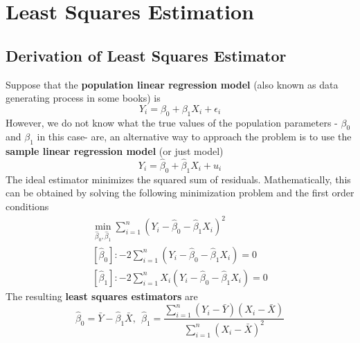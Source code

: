\chapter{Least Squares Estimation}
\section{Derivation of Least Squares Estimator}
Suppose that the \textbf{population linear regression model} (also known as data generating process in some books) is
\[
Y_i = \beta_0 + \beta_1X_i + \epsilon_i
\]
However, we do not know what the true values of the population parameters - $\beta_0$ and $\beta_1$ in this case- are, an alternative way to approach the problem is to use the \textbf{sample linear regression model} (or just model)
\[
Y_i = \hat{\beta}_0 +\hat{\beta}_1X_i +u_i
\]
The ideal estimator minimizes the squared sum of residuals. Mathematically, this can be obtained by solving the following minimization problem and the first order conditions
\footnotesize{\begin{gather*}
\min_{\hat{\beta}_0, \hat{\beta}_1} \sum_{i=1}^n (Y_i-\hat{\beta}_0 - \hat{\beta}_1X_i)^2\\
[\hat{\beta}_0]: -2\sum_{i=1}^n(Y_i-\hat{\beta}_0-\hat{\beta}_1X_i)=0\\
[\hat{\beta}_1]: -2\sum_{i=1}^nX_i(Y_i-\hat{\beta}_0-\hat{\beta}_1X_i)=0 
\end{gather*}}\normalsize
The resulting \textbf{least squares estimators} are
\[
\hat{\beta}_0 = \bar{Y}-\hat{\beta}_1\bar{X}, \ \ \hat{\beta}_1=\frac{\sum_{i=1}^n(Y_i-\bar{Y})(X_i-\bar{X})}{\sum_{i=1}^n(X_i-\bar{X})^2}
\]
